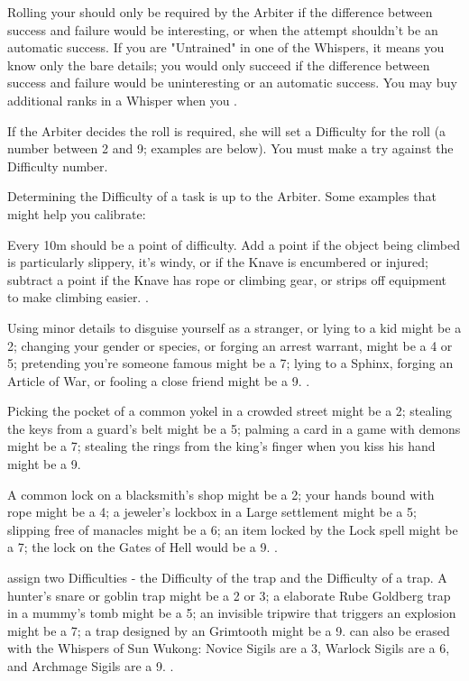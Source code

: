     Rolling your \KNAVE should only be required by the Arbiter if the difference between success and failure would be interesting, or when the attempt shouldn't be an automatic success.  If you are "Untrained" in one of the Whispers, it means you know only the bare details; you would only succeed if the difference between success and failure would be uninteresting or an automatic success. You may buy additional ranks in a Whisper when you .


 If the Arbiter decides the roll is required, she will set a Difficulty for the roll (a number between 2 and 9; examples are below). You must make a \RB{\KNAVE} try against the Difficulty number.

 Determining the Difficulty of a task is up to the Arbiter. Some examples that might help you calibrate:


   Every 10m should be a point of difficulty.  Add a point if the object being climbed is particularly slippery, it's windy, or if the Knave is encumbered or injured; subtract a point if the Knave has rope or climbing gear, or strips off equipment to make climbing easier. .

      Using minor details to disguise yourself as a stranger, or lying to a kid might be a 2; changing your gender or species, or forging an arrest warrant, might be a 4 or 5; pretending you're someone famous might be a 7; lying to a Sphinx, forging an Article of War, or fooling a close friend might be a 9. .

     Picking the pocket of a common yokel in a crowded street might be a 2; stealing the keys from a guard's belt might be a 5; palming a card in a game with demons might be a 7; stealing the rings from the king's finger when you kiss his hand might be a 9. 

       A common lock on a blacksmith's shop might be a 2; your hands bound with rope might be a 4; a jeweler's lockbox in a Large settlement might be a 5; slipping free of manacles might be a 6;  an item locked by the Lock spell might be a 7; the lock on the Gates of Hell would be a 9. .

        assign two Difficulties - the Difficulty of  the trap and the Difficulty of  a trap.  A hunter's snare or goblin trap might be a 2 or 3; a elaborate Rube Goldberg trap in a mummy's tomb might be a 5; an invisible tripwire that triggers an explosion might be a 7; a trap designed by an Grimtooth might be a 9.  can also be erased with the Whispers of Sun Wukong: Novice Sigils are a 3, Warlock Sigils are a 6, and Archmage Sigils are a 9. .
  
